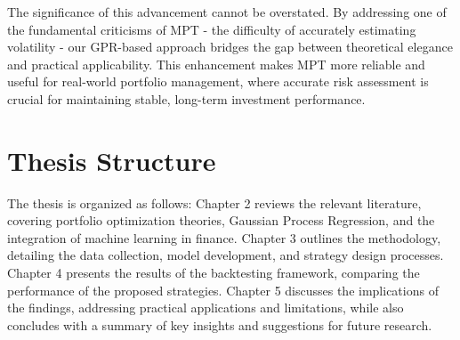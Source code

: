 The significance of this advancement cannot be overstated. By addressing one of the fundamental criticisms of \ac{MPT} - the difficulty of accurately estimating volatility - our \ac{GPR}-based approach bridges the gap between theoretical elegance and practical applicability. This enhancement makes \ac{MPT} more reliable and useful for real-world portfolio management, where accurate risk assessment is crucial for maintaining stable, long-term investment performance.



\section{Thesis Structure}
The thesis is organized as follows: Chapter 2 reviews the relevant literature, covering portfolio optimization theories, Gaussian Process Regression, and the integration of machine learning in finance. Chapter 3 outlines the methodology, detailing the data collection, model development, and strategy design processes. Chapter 4 presents the results of the backtesting framework, comparing the performance of the proposed strategies. Chapter 5 discusses the implications of the findings, addressing practical applications and limitations, while also concludes with a summary of key insights and suggestions for future research.
